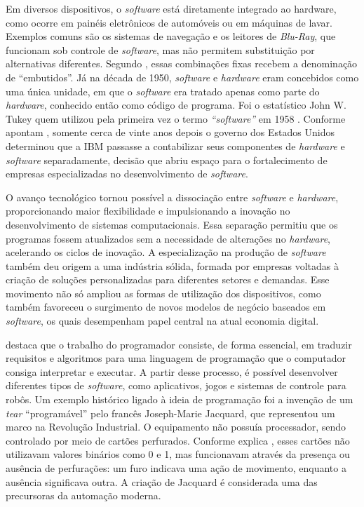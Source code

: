 \documentclass[english,brazilian]{UNISINOSartigo} %
\begin{document}
Em diversos dispositivos, o \textit{software} está diretamente integrado ao hardware, como ocorre em painéis eletrônicos de automóveis ou em máquinas de lavar. Exemplos comuns são os sistemas de navegação e os leitores de\textit{ Blu-Ray}, que funcionam sob controle de \textit{software}, mas não permitem substituição por alternativas diferentes. Segundo , essas combinações fixas recebem a denominação de “embutidos”. Já na década de 1950, \textit{software} e \textit{hardware} eram concebidos como uma única unidade, em que o \textit{software} era tratado apenas como parte do \textit{hardware}, conhecido então como código de programa. Foi o estatístico John W. Tukey quem utilizou pela primeira vez o termo \textit{“software”} em 1958 \cite{maynard2015}. Conforme apontam , somente cerca de vinte anos depois o governo dos Estados Unidos determinou que a IBM passasse a contabilizar seus componentes de \textit{hardware} e \textit{software} separadamente, decisão que abriu espaço para o fortalecimento de empresas especializadas no desenvolvimento de \textit{software}.

O avanço tecnológico tornou possível a dissociação entre \textit{software} e \textit{hardware}, proporcionando maior flexibilidade e impulsionando a inovação no desenvolvimento de sistemas computacionais. Essa separação permitiu que os programas fossem atualizados sem a necessidade de alterações no \textit{hardware}, acelerando os ciclos de inovação. A especialização na produção de \textit{software} também deu origem a uma indústria sólida, formada por empresas voltadas à criação de soluções personalizadas para diferentes setores e demandas. Esse movimento não só ampliou as formas de utilização dos dispositivos, como também favoreceu o surgimento de novos modelos de negócio baseados em \textit{software}, os quais desempenham papel central na atual economia digital.

 destaca que o trabalho do programador consiste, de forma essencial, em traduzir requisitos e algoritmos para uma linguagem de programação que o computador consiga interpretar e executar. A partir desse processo, é possível desenvolver diferentes tipos de \textit{software}, como aplicativos, jogos e sistemas de controle para robôs. Um exemplo histórico ligado à ideia de programação foi a invenção de um \textit{tear} “programável” pelo francês Joseph-Marie Jacquard, que representou um marco na Revolução Industrial. O equipamento não possuía processador, sendo controlado por meio de cartões perfurados. Conforme explica , esses cartões não utilizavam valores binários como 0 e 1, mas funcionavam através da presença ou ausência de perfurações: um furo indicava uma ação de movimento, enquanto a ausência significava outra. A criação de Jacquard é considerada uma das precursoras da automação moderna.
\end{document}
